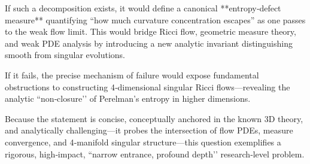 If such a decomposition exists, it would define a canonical **entropy‑defect measure** quantifying “how much curvature concentration escapes” as one passes to the weak flow limit. This would bridge Ricci flow, geometric measure theory, and weak PDE analysis by introducing a new analytic invariant distinguishing smooth from singular evolutions.

If it fails, the precise mechanism of failure would expose fundamental obstructions to constructing 4‑dimensional singular Ricci flows—revealing the analytic “non‑closure’’ of Perelman’s entropy in higher dimensions.

Because the statement is concise, conceptually anchored in the known 3D theory, and analytically challenging—it probes the intersection of flow PDEs, measure convergence, and 4‑manifold singular structure—this question exemplifies a rigorous, high‑impact, “narrow entrance, profound depth’’ research‑level problem.